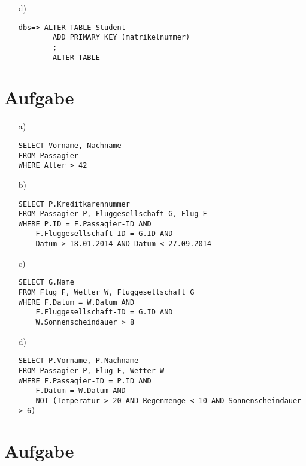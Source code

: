 \begin{itemize}
\begin{lstlisting}[style=Bash]
	\end{lstlisting}

	\item[d)]

	\begin{lstlisting}[style=Bash]
		dbs=> ALTER TABLE Student
		ADD PRIMARY KEY (matrikelnummer)
		;
		ALTER TABLE
	\end{lstlisting}

\end{itemize}

\section{Aufgabe}

\begin{itemize}

\item[a)]
\begin{Verbatim}
SELECT Vorname, Nachname
FROM Passagier
WHERE Alter > 42
\end{Verbatim}

\item[b)]
\begin{Verbatim}
SELECT P.Kreditkarennummer
FROM Passagier P, Fluggesellschaft G, Flug F
WHERE P.ID = F.Passagier-ID AND
	F.Fluggesellschaft-ID = G.ID AND
	Datum > 18.01.2014 AND Datum < 27.09.2014
\end{Verbatim}

\item[c)]
\begin{Verbatim}
SELECT G.Name
FROM Flug F, Wetter W, Fluggesellschaft G 
WHERE F.Datum = W.Datum AND
	F.Fluggesellschaft-ID = G.ID AND
	W.Sonnenscheindauer > 8
\end{Verbatim}

\item[d)]
\begin{Verbatim}
SELECT P.Vorname, P.Nachname
FROM Passagier P, Flug F, Wetter W 
WHERE F.Passagier-ID = P.ID AND
	F.Datum = W.Datum AND
	NOT (Temperatur > 20 AND Regenmenge < 10 AND Sonnenscheindauer > 6)
\end{Verbatim}

\end{itemize}

\section{Aufgabe}

